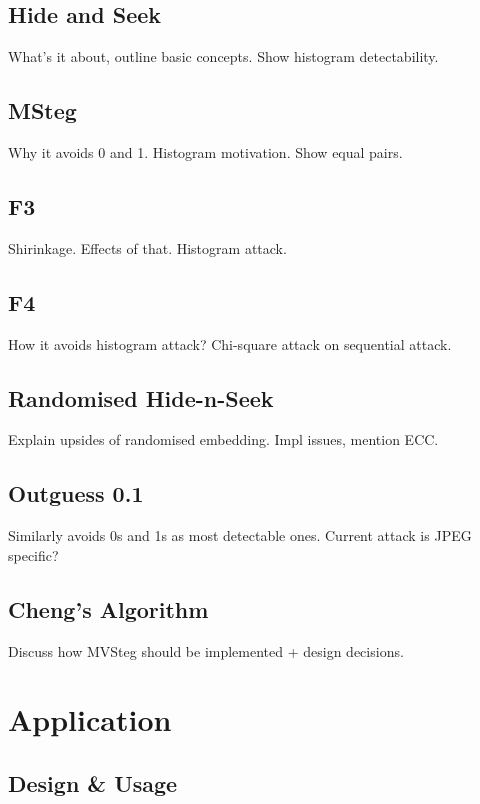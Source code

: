 \documentclass[12pt,british,twoside,notitlepage,usenames,dvipsnames,hypens,final]{report}
\numberwithin{equation}{section}
\numberwithin{figure}{section}
\begin{document}
\subsection{Hide and Seek}

What's it about, outline basic concepts. Show histogram detectability.

\subsection{MSteg}

Why it avoids 0 and 1. Histogram motivation. Show equal pairs.

\subsection{F3}

Shirinkage. Effects of that. Histogram attack.

\subsection{F4}

How it avoids histogram attack? Chi-square attack on sequential attack.

\subsection{Randomised Hide-n-Seek}

Explain upsides of randomised embedding. Impl issues, mention ECC. 

\subsection{Outguess 0.1}

Similarly avoids 0s and 1s as most detectable ones. Current attack is JPEG specific?

\subsection{Cheng's Algorithm}

Discuss how MVSteg should be implemented + design decisions.

\section{Application}

\subsection{Design \& Usage}
\end{document}

